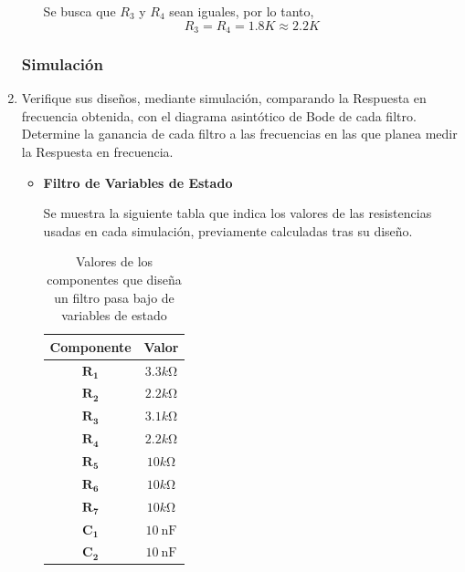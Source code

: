 \begin{enumerate}
\begin{itemize}
                    Se busca que $R_3$ y $R_4$ sean iguales, por lo tanto, $$R_3=R_4=1.8K\approx 2.2K$$
            \end{itemize}
        \subsubsection{Simulación}
        \item Verifique sus diseños, mediante simulación, comparando la Respuesta en frecuencia obtenida, con el diagrama asintótico de Bode de cada filtro. Determine la ganancia de cada filtro a las frecuencias en las que planea medir la Respuesta en frecuencia.

        \begin{itemize}
            \item \textbf{Filtro de Variables de Estado}

                Se muestra la siguiente tabla que indica los valores de las resistencias usadas en cada simulación, previamente calculadas tras su diseño.

                \begin{table}[H]
                    \centering
                    \begin{tabular}{|c|c|}
                        \hline
                        \textbf{Componente} & \textbf{Valor} \\\hline
                        $\mathbf{R_1}$ &  $3.3k\si{\ohm}$ \\\hline
                        $\mathbf{R_2}$ & $2.2k \si{\ohm}$  \\\hline
                        $\mathbf{R_3}$ & $3.1k \si{\ohm}$  \\\hline
                        $\mathbf{R_4}$ & $2.2k \si{\ohm}$   \\\hline
                        $\mathbf{R_5}$ & $10k\si{\ohm}$  \\\hline
                        $\mathbf{R_6}$  & $10k\si{\ohm}$ \\\hline
                        $\mathbf{R_7}$  & $10k\si{\ohm}$ \\\hline
                        $\mathbf{C_1}$  & $\SI{10}{\nano\farad}$ \\\hline
                        $\mathbf{C_2}$  & $\SI{10}{\nano\farad}$ \\\hline
                    \end{tabular}
                    \caption{Valores de los componentes que diseña un filtro pasa bajo de variables de estado}
                    \label{tab:diseño_var_estado}
                \end{table}


\end{itemize}
\end{enumerate}

